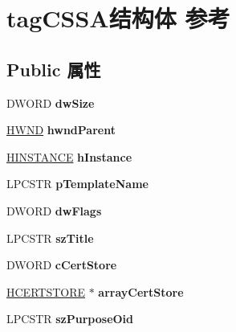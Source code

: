 \hypertarget{structtag_c_s_s_a}{}\section{tag\+C\+S\+S\+A结构体 参考}
\label{structtag_c_s_s_a}
\subsection*{Public 属性}
\begin{DoxyCompactItemize}
\item 
\mbox{\label{structtag_c_s_s_a_ac9e2d5f5a5491b458d99a1442244460b}} 
D\+W\+O\+RD {\bfseries dw\+Size}
\item 
\mbox{\label{structtag_c_s_s_a_a00864479fddfb173175781d3f498b5c2}} 
\hyperlink{interfacevoid}{H\+W\+ND} {\bfseries hwnd\+Parent}
\item 
\mbox{\label{structtag_c_s_s_a_a54395081ab3c0f277602cc8454bd796e}} 
\hyperlink{interfacevoid}{H\+I\+N\+S\+T\+A\+N\+CE} {\bfseries h\+Instance}
\item 
\mbox{\label{structtag_c_s_s_a_a02a874e0db4b9e0c06159324ad4cd8f3}} 
L\+P\+C\+S\+TR {\bfseries p\+Template\+Name}
\item 
\mbox{\label{structtag_c_s_s_a_a44a9f34ce5acc2490a7bde511581d01b}} 
D\+W\+O\+RD {\bfseries dw\+Flags}
\item 
\mbox{\label{structtag_c_s_s_a_ad755c8f1bc239ccb860f5ab34283efd9}} 
L\+P\+C\+S\+TR {\bfseries sz\+Title}
\item 
\mbox{\label{structtag_c_s_s_a_a5af4aee3ef3602b20c3786d836c36ec4}} 
D\+W\+O\+RD {\bfseries c\+Cert\+Store}
\item 
\mbox{\label{structtag_c_s_s_a_a9bcd780564d45ec957003f81b54dfc33}} 
\hyperlink{interfacevoid}{H\+C\+E\+R\+T\+S\+T\+O\+RE} $\ast$ {\bfseries array\+Cert\+Store}
\item 
\mbox{\label{structtag_c_s_s_a_a1e8910e2662f9dff17a7354b9c17e2d6}} 
L\+P\+C\+S\+TR {\bfseries sz\+Purpose\+Oid}

\end{DoxyCompactItemize}
